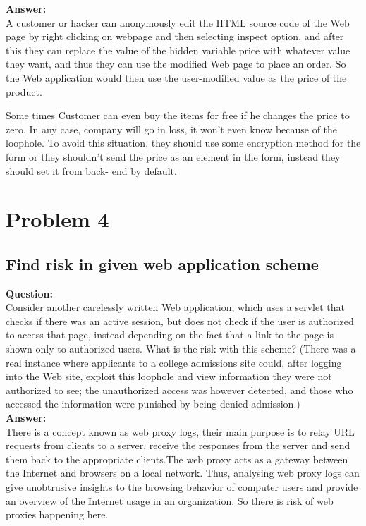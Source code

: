 \documentclass[12pt]{article}
\begin{document}
\noindent
\textbf{Answer: } \\

A customer or hacker can anonymously edit the HTML source code of the 
Web page by right clicking on webpage and then selecting inspect 
option, and after this they can replace the value of the hidden 
variable price with whatever value they want, and thus they can use
the modified Web page to place an order. So the Web application
would then use the user-modified value as the price of the product.


Some times Customer can even buy the items for free if he changes the
price to zero. In any case, company will go in loss, it won't even 
know because of the loophole. To avoid this situation, they should 
use some encryption method for the form or they shouldn't send the 
price as an element in the form, instead they should set it from back-
end by default. 

\singlespacing 

\newpage

\section{Problem 4}

\onehalfspacing
\subsection*{Find risk in given web application scheme}

\textbf{Question:} \\ 
Consider another carelessly written Web application, which uses a servlet that checks if there was an active session, but does not check if the user is authorized to access that page, instead depending on the fact that a link to the page is shown only to authorized users. What is the risk with this scheme? (There was a real instance where applicants to a college admissions site could, after logging into the Web site, exploit this loophole and view information they were not authorized to see; the unauthorized access was however detected, and those who accessed the information were punished by being denied admission.) \\

\noindent
\textbf{Answer: } \\ 
There is a concept known as web proxy logs, their main purpose is to relay URL requests from clients to a server, receive the responses from the server and send them back to the appropriate clients.The web proxy acts as a gateway between the Internet and browsers on a local network. Thus, analysing web proxy
logs can give unobtrusive insights to the browsing behavior of computer
users and provide an overview of the Internet usage in an organization. So there is risk of web proxies happening here. 
\end{document}
